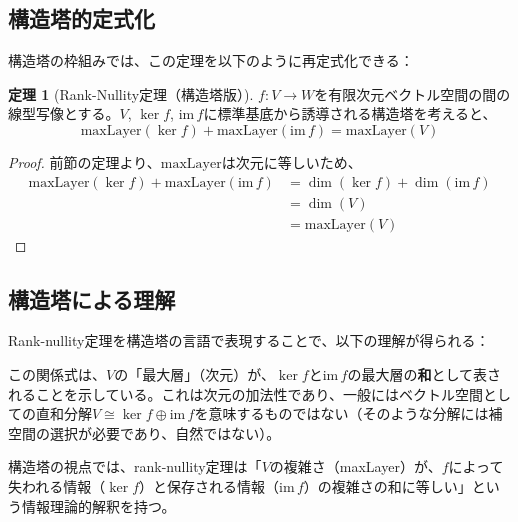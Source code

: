 \documentclass[a4paper,11pt]{ltjsarticle}
\theoremstyle{definition}
\newtheorem{theorem}[definition]{定理}
\begin{document}
\subsection{構造塔的定式化}

構造塔の枠組みでは、この定理を以下のように再定式化できる：

\begin{theorem}[Rank-Nullity定理（構造塔版）]\label{thm:rank_nullity_tower}
$f : V \to W$を有限次元ベクトル空間の間の線型写像とする。$V$, $\ker f$, $\mathrm{im}\, f$に標準基底から誘導される構造塔を考えると、
\[
\mathrm{maxLayer}(\ker f) + \mathrm{maxLayer}(\mathrm{im}\, f) = \mathrm{maxLayer}(V)
\]
\end{theorem}

\begin{proof}
前節の定理より、$\mathrm{maxLayer}$は次元に等しいため、
\begin{align*}
\mathrm{maxLayer}(\ker f) + \mathrm{maxLayer}(\mathrm{im}\, f)
&= \dim(\ker f) + \dim(\mathrm{im}\, f) \\
&= \dim(V) \\
&= \mathrm{maxLayer}(V)
\end{align*}
\end{proof}

\subsection{構造塔による理解}

Rank-nullity定理を構造塔の言語で表現することで、以下の理解が得られる：

\begin{center}
\end{center}

この関係式は、$V$の「最大層」（次元）が、$\ker f$と$\mathrm{im}\, f$の最大層の\textbf{和}として表されることを示している。これは次元の加法性であり、一般にはベクトル空間としての直和分解$V \cong \ker f \oplus \mathrm{im}\, f$を意味するものではない（そのような分解には補空間の選択が必要であり、自然ではない）。

構造塔の視点では、rank-nullity定理は「$V$の複雑さ（maxLayer）が、$f$によって失われる情報（$\ker f$）と保存される情報（$\mathrm{im}\, f$）の複雑さの和に等しい」という情報理論的解釈を持つ。
\end{document}
